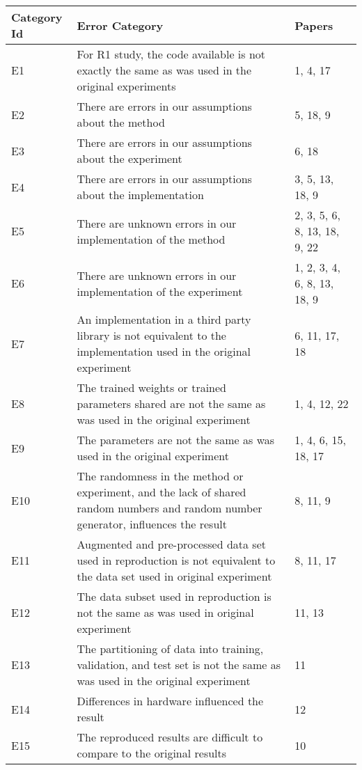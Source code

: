 \begin{tabularx}{\textwidth}{lXl}
\toprule
Category Id &                                                                                                                        Error Category &                        Papers \\
\midrule
 E1 &  For R1 study, the code available is not exactly the same as was used in the original experiments &  1, 4, 17 \\
 E2 &  There are errors in our assumptions about the method &  5, 18, 9 \\
 E3 &  There are errors in our assumptions about the experiment &  6, 18 \\
 E4 &  There are errors in our assumptions about the implementation &  3, 5, 13, 18, 9 \\
 E5 &  There are unknown errors in our implementation of the method &  2, 3, 5, 6, 8, 13, 18, 9, 22 \\
 E6 &  There are unknown errors in our implementation of the experiment &  1, 2, 3, 4, 6, 8, 13, 18, 9 \\
 E7 &  An implementation in a third party library is not equivalent to the implementation used in the original experiment &  6, 11, 17, 18 \\
 E8 &  The trained weights or trained parameters shared are not the same as was used in the original experiment &  1, 4, 12, 22 \\
 E9 &  The parameters are not the same as was used in the original experiment &  1, 4, 6, 15, 18, 17 \\
 E10 &  The randomness in the method or experiment, and the lack of shared random numbers and random number generator, influences the result &  8, 11, 9 \\
 E11 &  Augmented and pre-processed data set used in reproduction is not equivalent to the data set used in original experiment &  8, 11, 17 \\
 E12 &  The data subset used in reproduction is not the same as was used in original experiment &  11, 13 \\
 E13 &  The partitioning of data into training, validation, and test set is not the same as was used in the original experiment &  11 \\
 E14 &  Differences in hardware influenced the result &  12 \\
 E15 &  The reproduced results are difficult to compare to the original results &  10 \\
\bottomrule
\end{tabularx}
